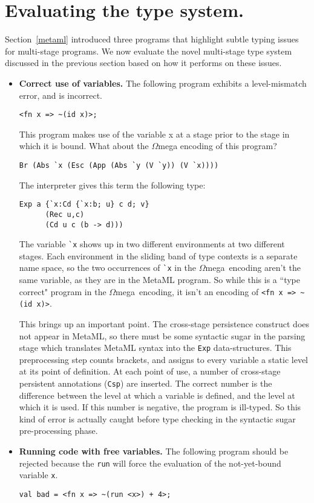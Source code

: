 \documentclass{sigplanconf}
\newcommand{\om}{$\Omega$mega}
\begin{document}
\section{Evaluating the type system.}
Section~\ref{metaml} introduced three programs that highlight
subtle typing issues for multi-stage programs.  We now evaluate the
novel multi-stage type system discussed in the previous
section based on how it performs on these issues.

\begin{itemize}
\item{\bf Correct use of variables.}
The following program exhibits a level-mismatch error, and is incorrect.
\begin{verbatim}
<fn x => ~(id x)>;
\end{verbatim}
This program makes use of the variable x at a stage 
prior to the stage in which it is bound. What about the \om{} encoding of this program?
\begin{verbatim}
Br (Abs `x (Esc (App (Abs `y (V `y)) (V `x))))
\end{verbatim}
The interpreter gives this term the following type:
\begin{verbatim}
Exp a {`x:Cd {`x:b; u} c d; v} 
      (Rec u,c) 
      (Cd u c (b -> d)))
\end{verbatim}

The variable \verb|`x| shows up in two different environments at two different
stages. Each environment in the sliding band of type contexts is a separate
name space, so the two occurrences of \verb|`x| in the \om\ encoding aren't
the same variable, as they are in the MetaML program. So while this is a ``type correct"
program in the \om\ encoding, it isn't an encoding of \verb|<fn x => ~(id x)>|.

This brings up an important point. The cross-stage persistence
construct does not appear in MetaML, so there must be some syntactic
sugar in the parsing stage which translates MetaML syntax into the {\tt Exp} data-structures.
This preprocessing step counts brackets, and assigns to every
variable a static level at its point of definition. At each point
of use, a number of cross-stage persistent annotations ({\tt Csp}) are
inserted. The correct number is the difference between the level
at which a variable is defined, and the level at which it is used.
If this number is negative, the program is ill-typed. So this kind
of error is actually caught before type checking in the syntactic
sugar pre-processing phase.

\vspace*{.1in}
\item{\bf Running code with free variables.} The following program should be
rejected because the {\tt run} will force the evaluation of the not-yet-bound
variable {\tt x}.
\begin{verbatim}
val bad = <fn x => ~(run <x>) + 4>;
\end{verbatim}


\end{itemize}
\end{document}
